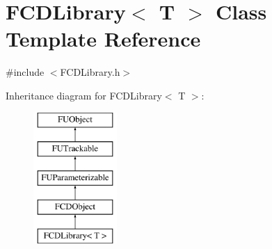 \hypertarget{classFCDLibrary}{
\section{FCDLibrary$<$ T $>$ Class Template Reference}
\label{classFCDLibrary}
}


{\ttfamily \#include $<$FCDLibrary.h$>$}

Inheritance diagram for FCDLibrary$<$ T $>$:\begin{figure}[H]
\begin{center}
\leavevmode
\includegraphics[height=5.000000cm]{classFCDLibrary}
\end{center}
\end{figure}
